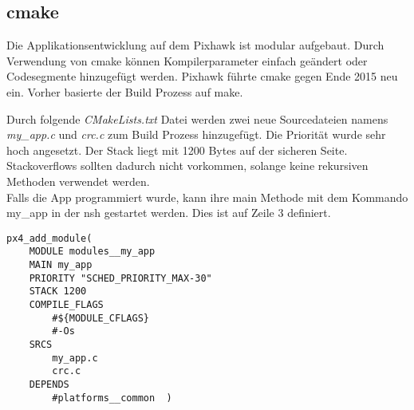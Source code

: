 \subsection{cmake}
Die Applikationsentwicklung auf dem Pixhawk ist modular aufgebaut. Durch Verwendung von cmake können Kompilerparameter einfach geändert oder Codesegmente hinzugefügt werden. Pixhawk führte cmake gegen Ende 2015 neu ein. Vorher basierte der Build Prozess auf make.

\noindent Durch folgende \textit{CMakeLists.txt} Datei werden zwei neue Sourcedateien namens \textit{my\_app.c} und \textit{crc.c} zum Build Prozess hinzugefügt. Die Priorität wurde sehr hoch angesetzt. Der Stack liegt mit 1200 Bytes auf der sicheren Seite. Stackoverflows sollten dadurch nicht vorkommen, solange keine rekursiven Methoden verwendet werden.\\
\noindent Falls die App programmiert wurde, kann ihre main Methode mit dem Kommando my\_app in der nsh gestartet werden. Dies ist auf Zeile 3 definiert.

\begin{lstlisting}
px4_add_module(
	MODULE modules__my_app
	MAIN my_app
	PRIORITY "SCHED_PRIORITY_MAX-30"
	STACK 1200
	COMPILE_FLAGS
		#${MODULE_CFLAGS}
		#-Os
	SRCS
		my_app.c
		crc.c
	DEPENDS
		#platforms__common	)
\end{lstlisting}

\clearpage
